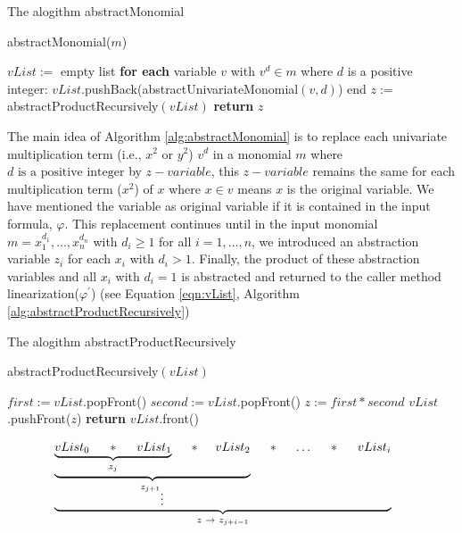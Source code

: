 \begin{algorithm}
\caption{The alogithm abstractMonomial} 
\label{alg:abstractMonomial}
abstractMonomial($m$)
\begin{algorithmic}[1]
\State $vList :=$ empty list
\State \textbf{for each} variable $v$ with $v^d \in m$ where $d$ is a positive integer:
\State \hspace{5mm} $vList$.pushBack(abstractUnivariateMonomial$(v, d)$)
\State end
\State $z :=$ abstractProductRecursively$(vList)$
\State \textbf{return} $z$
\end{algorithmic}
\end{algorithm}

\noindent The main idea of Algorithm \ref{alg:abstractMonomial} is to replace each univariate multiplication term (i.e., $x^2$ or $y^2$) $v^d$ in a monomial $m$ where $d \text{ is a positive integer}$ by $z-variable$, this $z-variable$ remains the same for each multiplication term ($x^2$) of $x$ where $x \in v$ means $x$ is the original variable.
We have mentioned the variable as original variable if it is contained in the input formula, $\varphi$.
This replacement continues until in the input monomial $m = x_{1}^{d_{1}}, \dots,x_{n}^{d_{n}}$ with $d_i \geq 1$ for all $i = 1, \dots, n$, we introduced an abstraction variable $z_i$ for each $x_i$ with $d_i > 1$.
Finally, the product of these abstraction variables and all $x_i$ with $d_i = 1$ is abstracted and returned to the caller method linearization($\varphi^\prime$) (see Equation \ref{eqn:vList}, Algorithm \ref{alg:abstractProductRecursively})\newline 

\begin{algorithm}
\caption{The alogithm abstractProductRecursively} 
\label{alg:abstractProductRecursively}
abstractProductRecursively$(vList)$
\begin{algorithmic}[1]
\State $first:= vList$.popFront() 
\State $second:= vList$.popFront()
\State $z:= first \ast second$
\State $vList$.pushFront($z$)
\EndWhile
\State \textbf{return} $vList$.front()
\end{algorithmic}
\end{algorithm}

\begin{align}
    \underbrace{ \underbrace{ \underbrace{ vList_{0} \hspace{5mm} \ast \hspace{5mm} vList_{1} }\limits_{z_{j}} \hspace{5mm} \ast \hspace{5mm} vList_{2} }\limits_{{z_{j+1}}_{\vdots}} \hspace{5mm} \ast \hspace{5mm} \dots \hspace{5mm} \ast \hspace{5mm} vList_{i}}\limits_{z \hspace{1mm} \to \hspace{1mm} z_{j+i-1}} \hspace{5mm} \label{eqn:vList}
\end{align}

